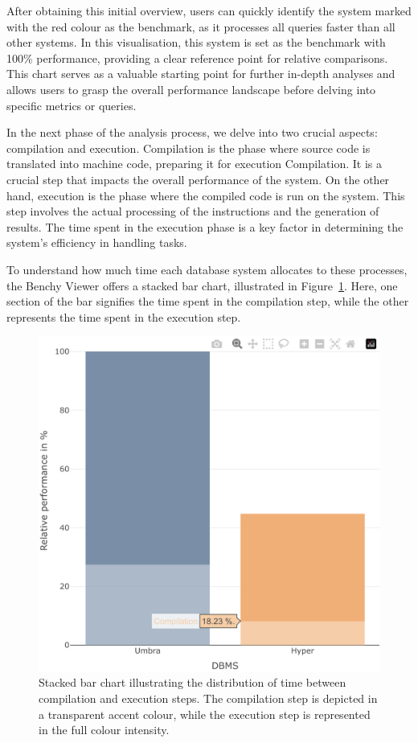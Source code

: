 After obtaining this initial overview, users can quickly identify the system marked with the red colour as the benchmark, as it processes all queries faster than all other systems. In this visualisation, this system is set as the benchmark with 100\% performance, providing a clear reference point for relative comparisons.\\
This chart serves as a valuable starting point for further in-depth analyses and allows users to grasp the overall performance landscape before delving into specific metrics or queries.

In the next phase of the analysis process, we delve into two crucial aspects: compilation and execution. Compilation is the phase where source code is translated into machine code, preparing it for execution Compilation. It is a crucial step that impacts the overall performance of the system. On the other hand, execution is the phase where the compiled code is run on the system. This step involves the actual processing of the instructions and the generation of results. The time spent in the execution phase is a key factor in determining the system's efficiency in handling tasks.

To understand how much time each database system allocates to these processes, the Benchy Viewer offers a stacked bar chart, illustrated in Figure~\ref{fig:execution-compilation}. Here, one section of the bar signifies the time spent in the compilation step, while the other represents the time spent in the execution step.

\begin{figure}[h]
  \centering
  \includegraphics[width=0.5\linewidth]{figures/bsp-compilation-execution.png}
  \caption{Stacked bar chart illustrating the distribution of time between compilation and execution steps. The compilation step is depicted in a transparent accent colour, while the execution step is represented in the full colour intensity.}
  \label{fig:execution-compilation}
\end{figure}

